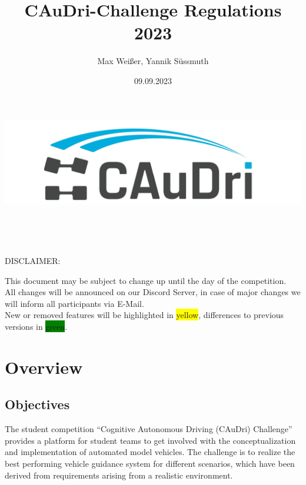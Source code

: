 \documentclass[a4paper]{report}
\title{CAuDri-Challenge Regulations 2023}
\author{Max Weißer, Yannik Süssmuth}
\date{09.09.2023}
\begin{document}
\begin{titlepage}
	\makeatletter
	\begin{center}
	\vspace*{3cm}
	
	\includegraphics[width=\textwidth]{source/graphics/caudri_logo_no_border.jpg}\\
	\vspace{1cm}
	
	\Huge\bfseries\@title\\
	\vspace{\baselineskip}
	
	\Large\@date\\
	\vspace{8cm}

	\large DISCLAIMER:\\
	
	{\raggedright This document may be subject to change up until the day of the competition.\\
	All changes will be announced on our Discord Server, in case of major changes we will inform all participants via E-Mail.\\
	New or removed features will be highlighted in \colorbox{yellow}{yellow}, differences to previous versions in \colorbox{green}{green}.\\}

	\end{center}	
	\makeatother
\end{titlepage}


\tableofcontents


\chapter{Overview} 

\section{Objectives}

The student competition “Cognitive Autonomous Driving (CAuDri) Challenge” provides a platform for student teams to get involved with the conceptualization and implementation of automated model vehicles. The challenge is to realize the best performing vehicle guidance system for different scenarios, which have been derived from requirements arising from a realistic environment. 
\end{document}
